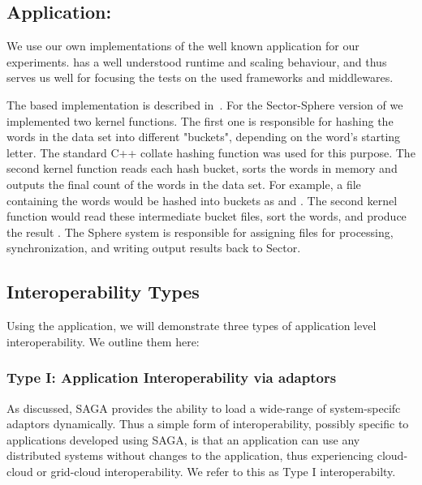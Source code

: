 \documentclass[3p,twocolumn]{elsarticle}
\begin{document}
\subsection{Application: \Wc}
\label{ssec:app}

We use our own implementations of the well known \wc application for
our experiments.  \Wc has a well understood runtime and scaling
behaviour, and thus serves us well for focusing the tests on the used
frameworks and middlewares.

The \mr based \wc implementation is described in~\cite{saga_ccgrid09}.
For the Sector-Sphere version of \wc we implemented two kernel
functions. The first one is responsible for hashing the
words in the data set into different "buckets", depending on
the word's starting letter.  The standard C++ collate hashing function
was used for this purpose.  The second kernel function reads each hash
bucket, sorts the words in memory and outputs the final count of
the words in the data set.  For example, a file containing the words
 would be hashed into buckets as
 and .  The second kernel
function would read these intermediate bucket files, sort the words,
and produce the result .  The Sphere system is responsible for assigning files for
processing, synchronization, and writing output results back to
Sector.

\subsection{Interoperability Types}

Using the \wc application, we will demonstrate three types of
application level interoperability. We outline them here:


\subsubsection{Type I: Application Interoperability via adaptors}
%
%

As discussed, SAGA provides the ability to load a wide-range of
system-specifc adaptors dynamically. Thus a simple form of
interoperability, possibly specific to applications developed using
SAGA, is that an application can use any distributed systems without
changes to the application, thus experiencing cloud-cloud or
grid-cloud interoperability.  We refer to this as Type I
interoperabilty.
\end{document}
